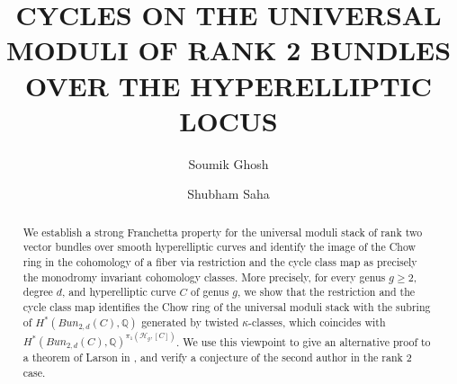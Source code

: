 \documentclass[11pt]{amsart}
\title[]{\MakeUppercase{Cycles on the universal moduli of rank 2 bundles over the hyperelliptic locus} }
\author{Soumik Ghosh}
\author{Shubham Saha}
\theoremstyle{definition}
\begin{document}
	\begin{abstract}
We establish a strong Franchetta property for the universal moduli stack of rank two vector bundles over smooth hyperelliptic curves and identify the image of the Chow ring in the cohomology of a fiber via restriction and the cycle class map as precisely the monodromy invariant cohomology classes. More precisely, for every genus $g\geq 2$, degree $d$, and hyperelliptic curve $C$ of genus $g$, we show that the restriction and the cycle class map identifies the Chow ring of the universal moduli stack with the subring of $H^* (Bun_{2,d}(C),\mathbb Q)$ generated by twisted $\kappa$-classes, which coincides with $H^{*}(Bun_{2,d}(C), \mathbb Q)^{\pi_1(\mathcal H_g,[C])}$. We use this viewpoint to give an alternative proof to a theorem of Larson in \cite{larson-24}, and verify a conjecture of the second author in the rank $2$ case.   
	\end{abstract}
	\maketitle
    \thispagestyle{headings}
	\vspace{-1em}
    \setcounter{tocdepth}{1} 
\tableofcontents
\setcounter{section}{0}
\end{document}
